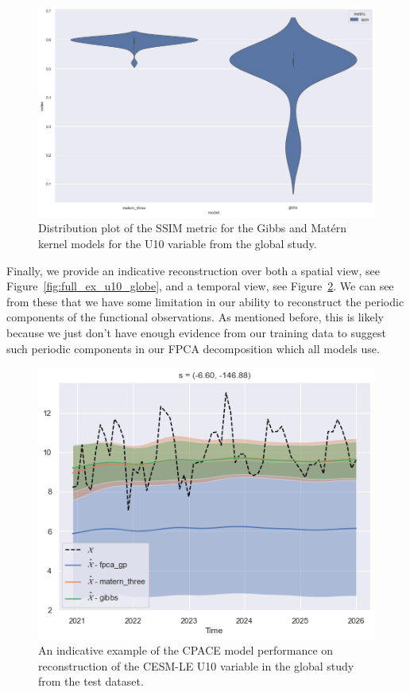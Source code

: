 \begin{figure}
	\centering
	\includegraphics[width=\textwidth]{cesm_u10_dist}
	\caption{Distribution plot of the SSIM metric for the Gibbs and Mat\'ern kernel models for the U10 variable from the global study.}
	\label{fig:cesm_u10_dist}
\end{figure}

Finally, we provide an indicative reconstruction over both a spatial view, see Figure~\ref{fig:full_ex_u10_globe}, and a temporal view, see Figure~\ref{fig:test_ex_u10_globe}.
We can see from these that we have some limitation in our ability to reconstruct the periodic components of the functional observations.
As mentioned before, this is likely because we just don't have enough evidence from our training data to suggest such periodic components in our FPCA decomposition which all models use.

\begin{figure}
\centering
\includegraphics[width=\textwidth]{test_ex_u10_globe}
\caption{An indicative example of the CPACE model performance on reconstruction of the CESM-LE U10 variable in the global study from the test dataset.}
\label{fig:test_ex_u10_globe}
\end{figure}


